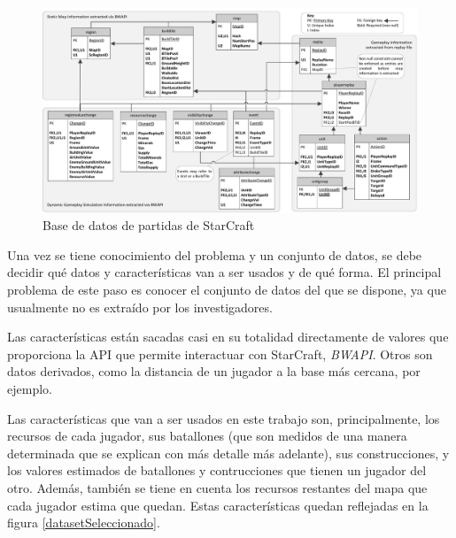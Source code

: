 \documentclass[a4paper,11pt]{book}\usepackage[]{graphicx}\usepackage[]{color}
\makeatletter
\def\maxwidth{ %
  \ifdim\Gin@nat@width>\linewidth
    \linewidth
  \else
    \Gin@nat@width
  \fi
}
\theoremstyle{plain}
\theoremstyle{definition}
\makeatother
\begin{document}
\begin{figure}
    \centering
    \includegraphics[width=\maxwidth]{figure/Robertson14DatabaseDiagram}
    \caption{Base de datos de partidas de StarCraft}
    \label{dataset}
\end{figure}



Una vez se tiene conocimiento del problema y un conjunto de datos, se
debe decidir qué datos y características van a ser usados y de qué
forma. El principal problema de este paso es conocer el conjunto de
datos del que se dispone, ya que usualmente no es extraído por los
investigadores.

Las características están sacadas casi en su totalidad directamente de
valores que proporciona la API que permite interactuar con StarCraft,
\emph{BWAPI}. Otros son datos derivados, como la distancia de un
jugador a la base más cercana, por ejemplo.

Las características que van a ser usados en este trabajo son,
principalmente, los recursos de cada jugador, sus batallones (que son
medidos de una manera determinada que se explican con más detalle más
adelante), sus construcciones, y los valores estimados de batallones y
contrucciones que tienen un jugador del otro. Además, también se tiene
en cuenta los recursos restantes del mapa que cada jugador estima que
quedan. Estas características quedan reflejadas en la figura
\ref{datasetSeleccionado}.
\end{document}
